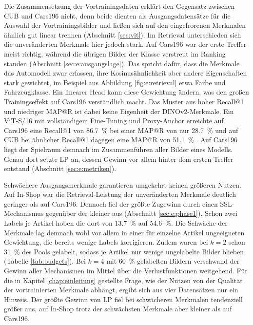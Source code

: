 Die Zusammensetzung der Vortrainingsdaten erklärt den Gegensatz zwischen \ac{CUB} und Cars196 nicht, denn beide dienten als Ausgangsdatensätze für die Auswahl der Vortrainingsbilder und ließen sich auf den eingefrorenen Merkmalen ähnlich gut linear trennen (Abschnitt \ref{sec:vit}). Im Retrieval unterschieden sich die unveränderten Merkmale hier jedoch stark. Auf Cars196 war der erste Treffer meist richtig, während die übrigen Bilder der Klasse verstreut im Ranking standen (Abschnitt \ref{sec:e:ausgangslage}). Das spricht dafür, dass die Merkmale das Automodell zwar erfassen, ihre Kosinusähnlichkeit aber andere Eigenschaften stark gewichtet, im Beispiel aus Abbildung \ref{fig:e:retrieval} etwa Farbe und Fahrzeugklasse. Ein linearer Head kann diese Gewichtung ändern, was den großen Trainingseffekt auf Cars196 verständlich macht. Das Muster aus hoher Recall@1 und niedriger \ac{MAP@R} ist dabei keine Eigenheit der DINOv2-Merkmale. Ein ViT-S/16 mit vollständigem Fine-Tuning und Proxy-Anchor erreichte auf Cars196 eine Recall@1 von \qty{86.7}{\percent} bei einer \ac{MAP@R} von nur \qty{28.7}{\percent} und auf \ac{CUB} bei ähnlicher Recall@1 dagegen eine \ac{MAP@R} von \qty{51.1}{\percent} \cite{ren_learning_2024}. Auf Cars196 liegt der Spielraum demnach im Zusammenführen aller Bilder eines Modells. Genau dort setzte \ac{LP} an, dessen Gewinn vor allem hinter dem ersten Treffer entstand (Abschnitt \ref{sec:e:metriken}).

Schwächere Ausgangsmerkmale garantieren umgekehrt keinen größeren Nutzen. Auf In-Shop war die Retrieval-Leistung der unveränderten Merkmale deutlich geringer als auf Cars196. Dennoch fiel der größte Zugewinn durch einen \ac{SSL}-Mechanismus gegenüber der \UEBL kleiner aus (Abschnitt \ref{sec:e:phase1}). Schon zwei Labels je Artikel hoben die \UEBL dort von \qty{13.7}{\percent} auf \qty{54.6}{\percent}. Die Schwäche der Merkmale lag demnach wohl vor allem in einer für einzelne Artikel ungeeigneten Gewichtung, die bereits wenige Labels korrigieren. Zudem waren bei $k=2$ schon \qty{31}{\percent} des Pools gelabelt, sodass je Artikel nur wenige ungelabelte Bilder blieben (Tabelle \ref{tab:budgets}). Bei $k=4$ mit \qty{60}{\percent} gelabelten Bildern verschwand der Gewinn aller Mechanismen im Mittel über die Verlustfunktionen weitgehend. Für die in Kapitel \ref{chap:einleitung} gestellte Frage, wie der Nutzen von der Qualität der vortrainierten Merkmale abhängt, ergibt sich aus vier Datensätzen nur ein Hinweis. Der größte Gewinn von \ac{LP} fiel bei schwächeren Merkmalen tendenziell größer aus, auf In-Shop trotz der schwächsten Merkmale aber kleiner als auf Cars196.

